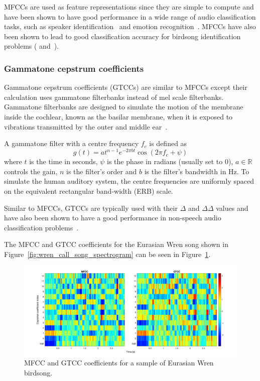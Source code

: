 MFCCs are used as feature representations since they are simple to compute and
have been shown to have good performance in a wide range of audio classification
tasks, such as speaker identification~\cite{muda2010voice} and emotion
recognition~\cite{likitha2017speech}. MFCCs have also been shown to lead to good
classification accuracy for birdsong identification problems
(\cite{fagerlund2007bird} and~\cite{ramashini2022robust}).

\subsubsection{Gammatone cepstrum coefficients}

Gammatone cepstrum coefficients (GTCCs) are similar to MFCCs except their
calculation  uses gammatone filterbanks instead of mel scale filterbanks.
Gammatone filterbanks are designed to simulate the motion of the membrane inside
the cochlear, known as the basilar membrane, when it is exposed to vibrations
transmitted by the outer and middle ear~\cite{patterson1992complex}.

A gammatone filter with a centre frequency $f_c$ is defined as
\begin{equation}
  g(t) = at^{n-1}e^{-2\pi b t} \cos(2\pi f_c + \psi)
\end{equation}
where $t$ is the time in seconds, $\psi$ is the phase in radians (usually set to
0), $a \in \mathbb{R}$ controls the gain, $n$ is the filter's order and $b$ is
the filter's bandwidth in Hz. To simulate the human auditory system, the centre
frequencies are uniformly spaced on the equivalent rectangular band-width (ERB)
scale.

Similar to MFCCs, GTCCs are typically used with their $\Delta$ and $\Delta\Delta$
values and have also been shown to have a good performance in
non-speech audio classification problems~\cite{valero2012gammatone}.

The MFCC and GTCC coefficients for the Eurasian Wren song shown in
Figure~\ref{fig:wren_call_song_spectrogram} can be seen in
Figure~\ref{fig:mfcc_gtcc_example}.

\begin{figure}[ht]
  \centering
  \includegraphics[width=\textwidth]{figures/mfcc_gtcc_example.png}
  \caption{MFCC and GTCC coefficients for a sample of Eurasian Wren
  birdsong.}\label{fig:mfcc_gtcc_example}
\end{figure}

